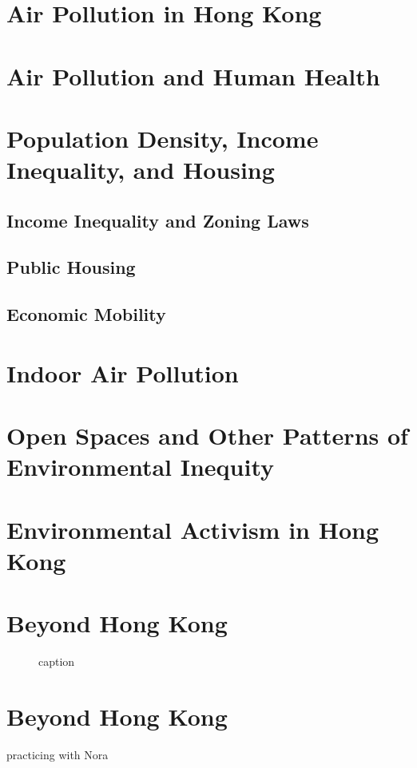 \documentclass{book}\usepackage{knitr}
\begin{document}
\begin{knitrout}
\begin{kframe}
{\section{Air Pollution in Hong Kong}
\section{Air Pollution and Human Health}
\section{Population Density, Income Inequality, and Housing}
\subsection{Income Inequality and Zoning Laws}
\subsection{Public Housing}
\subsection{Economic Mobility}
\section{Indoor Air Pollution}
\section{Open Spaces and Other Patterns of Environmental Inequity}
\section{Environmental Activism in Hong Kong}

\section{Beyond Hong Kong}

\begin{figure}
\caption{caption}
\label{title}
\end{figure}

\section{Beyond Hong Kong}

practicing with Nora


}
\end{kframe}
\end{knitrout}
\end{document}
